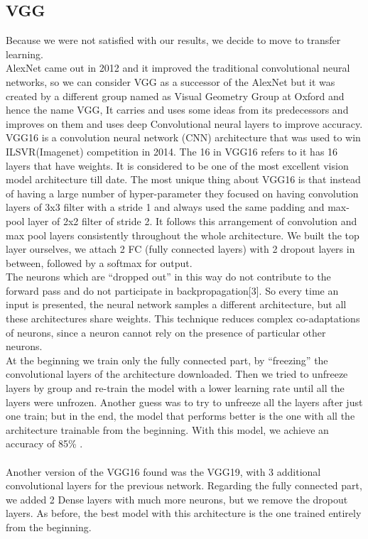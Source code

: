\documentclass[11pt, oneside]{article}
\begin{document}
\subsection{VGG}
Because we were not satisfied with our results, we decide to move to transfer learning.\\ AlexNet came out in 2012 and it improved the traditional convolutional neural networks, so we can consider VGG as a successor of the AlexNet but it was created by a different group named as Visual Geometry Group at Oxford and hence the name VGG, It carries and uses some ideas from its predecessors and improves on them and uses deep Convolutional neural layers to improve accuracy.\\
VGG16 is a convolution neural network (CNN) architecture that was used to win ILSVR(Imagenet) competition in 2014. The 16 in VGG16 refers to it has 16 layers that have weights. It is considered to be one of the most excellent vision model architecture till date. The most unique thing about VGG16 is that instead of having a large number of hyper-parameter they focused on having convolution layers of 3x3 filter with a stride 1 and always used the same padding and max-pool layer of 2x2 filter of stride 2. It follows this arrangement of convolution and max pool layers consistently throughout the whole architecture. We built the top layer ourselves, we attach 2 FC (fully connected layers) with 2 dropout layers in between, followed by a softmax for output. \\
The neurons which are “dropped out” in this way do not contribute to the forward pass and do not participate in backpropagation[3]. So every time an input is presented, the neural network samples a different architecture,
but all these architectures share weights. This technique reduces complex co-adaptations of neurons, since a neuron cannot rely on the presence of particular other neurons. \\
 At the beginning we train only the fully connected part, by “freezing” the convolutional layers of the architecture downloaded. Then we tried to unfreeze layers by group and re-train the model with a lower learning rate until all the layers were unfrozen. Another guess was to try to unfreeze all the layers after just one train; but in the end, the model that performs better is the one with all the architecture trainable from the beginning. With this model, we achieve an accuracy of 85\% . \\ \\
Another version of the VGG16 found was the VGG19, with 3 additional convolutional layers for the previous network. Regarding the fully connected part, we added 2 Dense layers with much more neurons, but we remove the dropout layers. As before, the best model with this architecture is the one trained entirely from the beginning.
\end{document}
